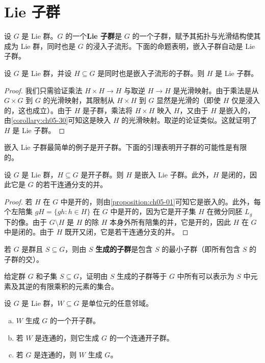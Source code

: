 \documentclass[../../main.tex]{subfiles}
\begin{document}
\section{Lie 子群}\label{section:ch07-Lie子群}

设 $G$ 是 Lie 群。$G$ 的一个\textbf{Lie 子群}是 $G$ 的一个子群，赋予其拓扑与光滑结构使其成为 Lie 群，同时也是 $G$ 的浸入子流形。下面的命题表明，嵌入子群自动是 Lie 子群。

\begin{proposition}\label{proposition:ch07-11}
设 $G$ 是 Lie 群，并设 $H\subseteq G$ 是同时也是嵌入子流形的子群。则 $H$ 是 Lie 子群。
\end{proposition}

\begin{proof}
我们只需验证乘法 $H\times H\to H$ 与取逆 $H\to H$ 是光滑映射。由于乘法是从 $G\times G$ 到 $G$ 的光滑映射，其限制从 $H\times H$ 到 $G$ 显然是光滑的（即使 $H$ 仅是浸入的，这也成立）。由于 $H$ 是子群，乘法将 $H\times H$ 映入 $H$，又由于 $H$ 是嵌入的，由\cref{corollary:ch05-30}可知这是映入 $H$ 的光滑映射。取逆的论证类似。这就证明了 $H$ 是 Lie 子群。
\end{proof}

嵌入 Lie 子群最简单的例子是开子群。下面的引理表明开子群的可能性是有限的。

\begin{lemma}\label{lemma:ch07-12}
设 $G$ 是 Lie 群，$H\subseteq G$ 是开子群。则 $H$ 是嵌入 Lie 子群。此外，$H$ 是闭的，因此它是 $G$ 的若干连通分支的并。
\end{lemma}

\begin{proof}
若 $H$ 在 $G$ 中是开的，则由\cref{proposition:ch05-01}可知它是嵌入的。此外，每个左陪集 $gH=\{gh:h\in H\}$ 在 $G$ 中是开的，因为它是开子集 $H$ 在微分同胚 $L_g$ 下的像。由于 $G\setminus H$ 是 $H$ 的除 $H$ 本身外所有陪集的并，它是开的，因此 $H$ 在 $G$ 中是闭的。由于 $H$ 既开又闭，它是若干连通分支的并。
\end{proof}

若 $G$ 是群且 $S\subseteq G$，则由 $S$ \textbf{生成的子群}是包含 $S$ 的最小子群（即所有包含 $S$ 的子群的交）。

\begin{exercise}\label{exercise:ch07-13}
给定群 $G$ 和子集 $S\subseteq G$，证明由 $S$ 生成的子群等于 $G$ 中所有可以表示为 $S$ 中元素及其逆的有限乘积的元素的集合。
\end{exercise}

\begin{proposition}\label{proposition:ch07-14}
设 $G$ 是 Lie 群，$W\subseteq G$ 是单位元的任意邻域。
\begin{enumerate}[(a)]
\item $W$ 生成 $G$ 的一个开子群。
\item 若 $W$ 是连通的，则它生成 $G$ 的一个连通开子群。
\item 若 $G$ 是连通的，则 $W$ 生成 $G$。
\end{enumerate}
\end{proposition}
\end{document}
